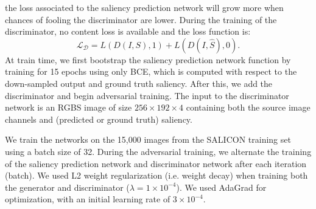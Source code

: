 \documentclass[times,twocolumn,final,authoryear]{elsarticle}
\begin{document}
the loss associated to the saliency prediction network will grow more when chances of fooling the discriminator are lower.
During the training of the discriminator, no content loss is available and  the loss function is:
\begin{equation}
\mathcal{L_D} =
L( D(I,S), 1) +
L( D(I,\hat{S}), 0).
\end{equation}
At train time, we first bootstrap the saliency prediction network  function by training for 15 epochs using only BCE, which is computed with respect to the down-sampled output and ground truth saliency. After this, we add the discriminator and begin adversarial training. The input to the discriminator network is an RGBS image of size $256\times 192\times 4$ containing both the source image channels and (predicted or ground truth) saliency. 


We train the networks on the 15,000 images from the SALICON training set using a batch size of 32. 
During the adversarial training, we alternate the training of the saliency prediction network and discriminator network after each iteration (batch). We used L2 weight regularization (i.e. weight decay) when training both the generator and discriminator ($\lambda = 1\times 10^{-4}$). We used AdaGrad for optimization, with an initial learning rate of $3\times 10^{-4}$.




\end{document}
